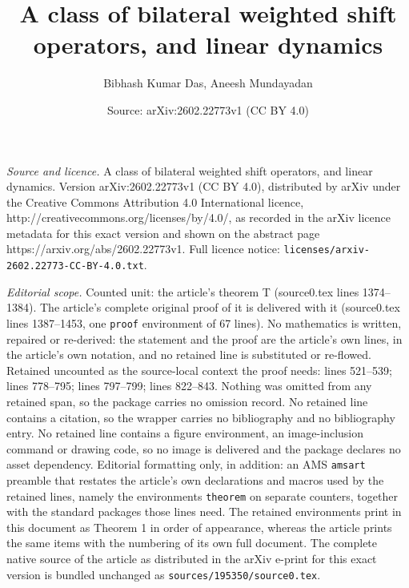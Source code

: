 \documentclass[10pt,a4paper]{amsart}
\title{{A class of bilateral weighted shift operators, and linear dynamics}}
\author{Bibhash Kumar Das, Aneesh Mundayadan}
\date{Source: arXiv:2602.22773v1 (CC BY 4.0)}
\begin{document}
\maketitle

\noindent\emph{Source and licence.} {A class of bilateral weighted shift operators, and linear dynamics}. Version arXiv:2602.22773v1 (CC BY 4.0), distributed by arXiv under the Creative Commons Attribution 4.0 International licence, http://creativecommons.org/licenses/by/4.0/, as recorded in the arXiv licence metadata for this exact version and shown on the abstract page https://arxiv.org/abs/2602.22773v1. Full licence notice: \texttt{licenses/arxiv-2602.22773-CC-BY-4.0.txt}.\par\smallskip

\noindent\textit{Editorial scope.} Counted unit: the article's theorem T (source0.tex lines 1374--1384). The article's complete original proof of it is delivered with it (source0.tex lines 1387--1453, one \texttt{proof} environment of 67 lines). No mathematics is written, repaired or re-derived: the statement and the proof are the article's own lines, in the article's own notation, and no retained line is substituted or re-flowed.  Retained uncounted as the source-local context the proof needs: lines 521--539; lines 778--795; lines 797--799; lines 822--843.  Nothing was omitted from any retained span, so the package carries no omission record.  No retained line contains a citation, so the wrapper carries no bibliography and no bibliography entry.  No retained line contains a figure environment, an image-inclusion command or drawing code, so no image is delivered and the package declares no asset dependency.  Editorial formatting only, in addition: an AMS \texttt{amsart} preamble that restates the article's own declarations and macros used by the retained lines, namely the environments \texttt{theorem} on separate counters, together with the standard packages those lines need.  The retained environments print in this document as Theorem 1 in order of appearance, whereas the article prints the same items with the numbering of its own full document.  The complete native source of the article as distributed in the arXiv e-print for this exact version is bundled unchanged as \texttt{sources/195350/source0.tex}.
\end{document}

